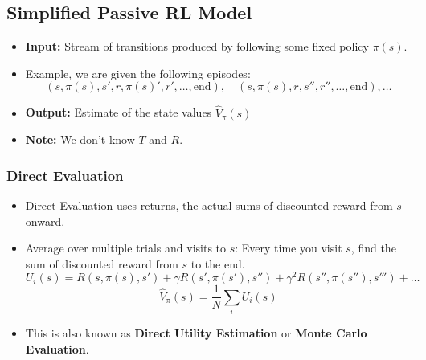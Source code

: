 \subsection{Simplified Passive RL Model}
\begin{definition}
    \begin{itemize}
        \item \textbf{Input:} Stream of transitions produced by following some fixed policy $\pi(s)$.
        \item Example, we are given the following episodes:
        \[
        (s, \pi(s), s', r, \pi(s)',r',\ldots, \text{end}), \quad (s, \pi(s), r, s'', r'', \ldots, \text{end}), \ldots
        \]
        \item \textbf{Output:} Estimate of the state values $\hat{V}_\pi(s)$ 
        \item \textbf{Note:} We don't know $T$ and $R$.
    \end{itemize}
\end{definition}

\subsubsection{Direct Evaluation}
\begin{itemize}
    \item Direct Evaluation uses returns, the actual sums of discounted reward from $s$ onward.
    \item Average over multiple trials and visits to $s$: Every time you visit $s$, find the sum of discounted reward from $s$ to the end.
    \[
    U_i(s) = R(s, \pi(s), s') + \gamma R(s', \pi(s'), s'') + \gamma^2 R(s'', \pi(s''), s''') + \dots
    \]
    \[
    \hat{V}_\pi(s) = \frac{1}{N} \sum_i U_i(s)
    \]
    \item This is also known as \textbf{Direct Utility Estimation} or \textbf{Monte Carlo Evaluation}.
\end{itemize}


